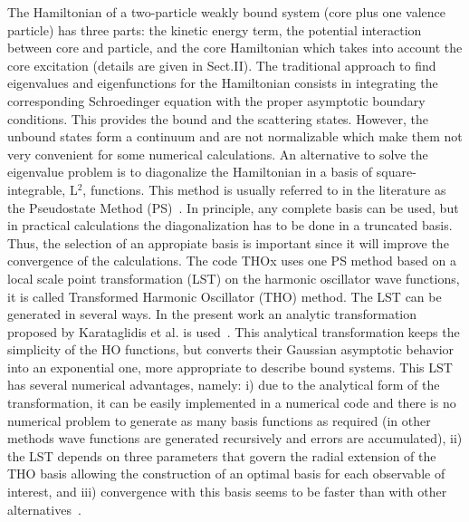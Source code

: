 \documentclass[preprint,12pt]{elsarticle}
\begin{document}
The Hamiltonian of a two-particle weakly bound system (core plus one
valence particle) has three parts: the kinetic energy term, the
potential interaction between core and particle, and the core Hamiltonian
which takes into account the core excitation (details are given in Sect.II).
The traditional approach to find eigenvalues and eigenfunctions for the
Hamiltonian consists in integrating the corresponding Schroedinger equation
with the proper asymptotic boundary conditions. This provides the
bound and the scattering states. However, the unbound states form a
continuum and are not normalizable which make them not very convenient for some
numerical calculations. An alternative to solve the eigenvalue problem is to
diagonalize the Hamiltonian in a basis of square-integrable, L$^2$, functions.
This method is usually referred to in the literature
as the Pseudostate Method (PS)~\cite{HT70,Mat03,manoli04}. In principle, any complete basis can be
used, but in practical calculations the
diagonalization has to be done in a truncated basis. Thus, the
selection of an appropiate basis is important since it will improve
the convergence of the calculations.
%
The code THOx uses one PS method based on a local scale point
transformation (LST) on the harmonic oscillator wave functions, it is called
Transformed Harmonic Oscillator (THO) method. The LST can be generated in
several ways. In the present work an analytic transformation proposed
by Karataglidis et al. is used~\cite{Amos}. This analytical transformation
keeps the simplicity of the HO functions, but converts their Gaussian
asymptotic behavior into an exponential one, more  appropriate to describe bound
systems. This LST has several numerical advantages, namely: i) due to
the analytical form of the 
transformation, it can be easily implemented in a numerical code and there is
no numerical problem to generate as many basis functions as required (in other
methods wave functions are generated recursively and errors are accumulated),
ii) the LST depends on three parameters that govern the radial extension 
of the THO basis allowing the construction of an optimal basis for 
each observable of interest, and iii) convergence with this basis seems to be
faster than with other alternatives~\cite{Mor09,Lay10}.
\end{document}
